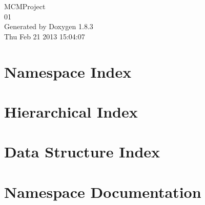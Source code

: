 \documentclass{book}
\begin{document}
\hypersetup{pageanchor=false,citecolor=blue}
\begin{titlepage}
\vspace*{7cm}
\begin{center}
{\Large M\-C\-M\-Project \\[1ex]\large 01 }\\
\vspace*{1cm}
{\large Generated by Doxygen 1.8.3}\\
\vspace*{0.5cm}
{\small Thu Feb 21 2013 15:04:07}\\
\end{center}
\end{titlepage}
\clearemptydoublepage
{}
\tableofcontents
\clearemptydoublepage
{}
\hypersetup{pageanchor=true,citecolor=blue}
\chapter{Namespace Index}

\chapter{Hierarchical Index}

\chapter{Data Structure Index}

\chapter{Namespace Documentation}



\end{document}
